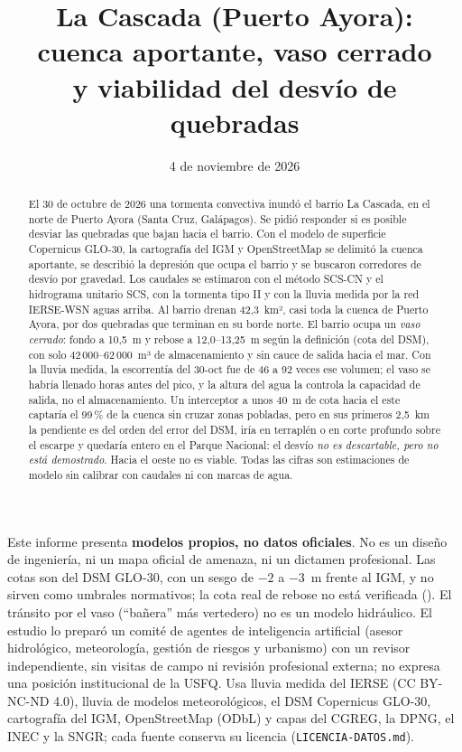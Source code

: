 \documentclass{sosg-informe}
\title{La Cascada (Puerto Ayora):\\cuenca aportante, vaso cerrado\\y viabilidad del desvío de quebradas}
\date{4 de noviembre de 2026}
\begin{document}
\maketitle

\begin{abstract}
El 30 de octubre de 2026 una tormenta convectiva inundó el barrio La Cascada, en el norte de Puerto Ayora (Santa Cruz, Galápagos). Se pidió responder si es posible desviar las quebradas que bajan hacia el barrio. Con el modelo de superficie Copernicus GLO-30, la cartografía del IGM y OpenStreetMap se delimitó la cuenca aportante, se describió la depresión que ocupa el barrio y se buscaron corredores de desvío por gravedad. Los caudales se estimaron con el método SCS-CN y el hidrograma unitario SCS, con la tormenta tipo II y con la lluvia medida por la red IERSE-WSN aguas arriba. Al barrio drenan 42,3~km², casi toda la cuenca de Puerto Ayora, por dos quebradas que terminan en su borde norte. El barrio ocupa un \emph{vaso cerrado}: fondo a 10,5~m y rebose a 12,0--13,25~m según la definición (cota del DSM), con solo 42\,000--62\,000~m³ de almacenamiento y sin cauce de salida hacia el mar. Con la lluvia medida, la escorrentía del 30-oct fue de 46 a 92 veces ese volumen; el vaso se habría llenado horas antes del pico, y la altura del agua la controla la capacidad de salida, no el almacenamiento. Un interceptor a unos 40~m de cota hacia el este captaría el 99\,\% de la cuenca sin cruzar zonas pobladas, pero en sus primeros 2,5~km la pendiente es del orden del error del DSM, iría en terraplén o en corte profundo sobre el escarpe y quedaría entero en el Parque Nacional: el desvío \emph{no es descartable, pero no está demostrado}. Hacia el oeste no es viable. Todas las cifras son estimaciones de modelo sin calibrar con caudales ni con marcas de agua.
\end{abstract}

\begin{aviso}
Este informe presenta \textbf{modelos propios, no datos oficiales}. No es un diseño de ingeniería, ni un mapa oficial de amenaza, ni un dictamen profesional. Las cotas son del DSM GLO-30, con un sesgo de $-2$ a $-3$~m frente al IGM, y no sirven como umbrales normativos; la cota real de rebose no está verificada (). El tránsito por el vaso (\enquote{bañera} más vertedero) no es un modelo hidráulico. El estudio lo preparó un comité de agentes de inteligencia artificial (asesor hidrológico, meteorología, gestión de riesgos y urbanismo) con un revisor independiente, sin visitas de campo ni revisión profesional externa; no expresa una posición institucional de la USFQ. Usa lluvia medida del IERSE (CC BY-NC-ND 4.0), lluvia de modelos meteorológicos, el DSM Copernicus GLO-30, cartografía del IGM, OpenStreetMap (ODbL) y capas del CGREG, la DPNG, el INEC y la SNGR; cada fuente conserva su licencia (\texttt{LICENCIA-DATOS.md}).
\end{aviso}
\end{document}
